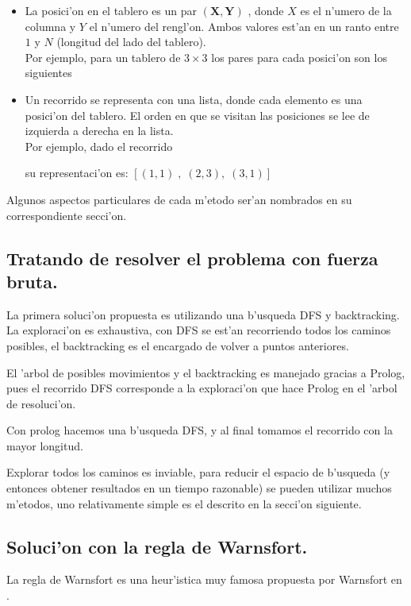 \documentclass[12pt]{article}
\begin{document}
    \begin{itemize}
        \item La posici'on en el tablero es un par  $\mathbf{(X,Y)}$ , donde
        $X$ es el n'umero de la columna y $Y$ el n'umero del rengl'on.
        Ambos valores est'an en un ranto entre $1$ y $N$ (longitud
        del lado del tablero). \\
        Por ejemplo, para un tablero de $3\times 3$ los
        pares para cada posici'on son los siguientes

        \item Un recorrido se representa con una lista, donde cada elemento
        es una posici'on del tablero. El orden en que se visitan las
        posiciones se lee de izquierda a derecha en la lista.\\
        Por ejemplo, dado el recorrido

        su representaci'on es: $[ (1,1) \; ,\; (2,3),\; (3,1) ]$

    \end{itemize}

    Algunos aspectos particulares de cada m'etodo ser'an nombrados
    en su correspondiente secci'on.


    \subsection{Tratando de resolver el problema con fuerza
    bruta.}

    La primera soluci'on propuesta es utilizando una b'usqueda DFS y backtracking.
    La exploraci'on es exhaustiva, con DFS se est'an recorriendo todos los caminos posibles, el backtracking
    es el encargado de volver a puntos anteriores.

    El 'arbol de posibles movimientos y el backtracking es manejado
    gracias a Prolog, pues el recorrido DFS corresponde
    a la exploraci'on que hace Prolog en el 'arbol de resoluci'on.



    Con prolog hacemos una b'usqueda DFS, y al final tomamos
    el recorrido con la mayor longitud.

    Explorar todos los caminos es inviable, para reducir el espacio
    de b'usqueda (y entonces obtener resultados en un tiempo razonable)
    se pueden utilizar muchos m'etodos, uno relativamente
    simple es el descrito en la secci'on siguiente.



    \subsection{Soluci'on con la regla de Warnsfort.}
    La regla de Warnsfort es una heur'istica
    muy famosa propuesta por Warnsfort en .
\end{document}

